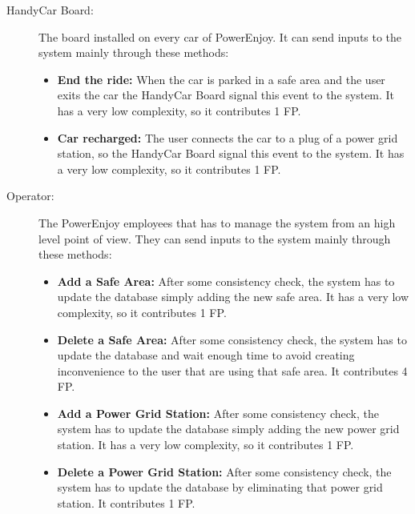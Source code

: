 \begin{description}
	\item[HandyCar Board:] The board installed on every car of PowerEnjoy. It can send inputs to the system mainly through these methods: 
	\begin{itemize}
	\item\textbf{End the ride:} When the car is parked in a safe area and the user exits the car the HandyCar Board signal this event to the system. It has a very low complexity, so it contributes 1 FP.
	\item\textbf{Car recharged:} The user connects the car to a plug of a power grid station, so the HandyCar Board signal this event to the system. It has a very low complexity, so it contributes 1 FP.
	\end{itemize}
	
	\item[Operator:] The PowerEnjoy employees that has to manage the system from an high level point of view. They can send inputs to the system mainly through these methods: 
	\begin{itemize}
	\item\textbf{Add a Safe Area:} After some consistency check, the system has to update the database simply adding the new safe area. It has a very low complexity, so it contributes 1 FP.
	\item\textbf{Delete a Safe Area:} After some consistency check, the system has to update the database and wait enough time to avoid creating inconvenience to the user that are using that safe area. It contributes 4 FP.
	\item\textbf{Add a Power Grid Station:} After some consistency check, the system has to update the database simply adding the new power grid station. It has a very low complexity, so it contributes 1 FP.
	\item\textbf{Delete a Power Grid Station:} After some consistency check, the system has to update the database by eliminating that power grid station. It contributes 1 FP.
	\end{itemize}
	
\end{description}